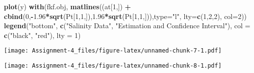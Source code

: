 \documentclass[]{article}
\newenvironment{Shaded}{\begin{snugshade}}{\end{snugshade}}
\newcommand{\DataTypeTok}[1]{\textcolor[rgb]{0.13,0.29,0.53}{#1}}
\newcommand{\DecValTok}[1]{\textcolor[rgb]{0.00,0.00,0.81}{#1}}
\newcommand{\FloatTok}[1]{\textcolor[rgb]{0.00,0.00,0.81}{#1}}
\newcommand{\KeywordTok}[1]{\textcolor[rgb]{0.13,0.29,0.53}{\textbf{#1}}}
\newcommand{\NormalTok}[1]{#1}
\newcommand{\OperatorTok}[1]{\textcolor[rgb]{0.81,0.36,0.00}{\textbf{#1}}}
\newcommand{\StringTok}[1]{\textcolor[rgb]{0.31,0.60,0.02}{#1}}
\begin{document}
\begin{Shaded}
\begin{Highlighting}[]
\KeywordTok{plot}\NormalTok{(y)}
\KeywordTok{with}\NormalTok{(fkf.obj, }\KeywordTok{matlines}\NormalTok{((at[}\DecValTok{1}\NormalTok{,]) }\OperatorTok{+}\StringTok{ }\KeywordTok{cbind}\NormalTok{(}\DecValTok{0}\NormalTok{,}\OperatorTok{-}\FloatTok{1.96}\OperatorTok{*}\KeywordTok{sqrt}\NormalTok{(Pt[}\DecValTok{1}\NormalTok{,}\DecValTok{1}\NormalTok{,]),}\FloatTok{1.96}\OperatorTok{*}\KeywordTok{sqrt}\NormalTok{(Pt[}\DecValTok{1}\NormalTok{,}\DecValTok{1}\NormalTok{,])),}\DataTypeTok{type=}\StringTok{"l"}\NormalTok{, }\DataTypeTok{lty=}\KeywordTok{c}\NormalTok{(}\DecValTok{1}\NormalTok{,}\DecValTok{2}\NormalTok{,}\DecValTok{2}\NormalTok{), }\DataTypeTok{col=}\DecValTok{2}\NormalTok{))}
\KeywordTok{legend}\NormalTok{(}\StringTok{"bottom"}\NormalTok{, }\KeywordTok{c}\NormalTok{(}\StringTok{"Salinity Data"}\NormalTok{, }\StringTok{"Estimation and Confidence Interval"}\NormalTok{),}
       \DataTypeTok{col =} \KeywordTok{c}\NormalTok{(}\StringTok{"black"}\NormalTok{, }\StringTok{"red"}\NormalTok{), }\DataTypeTok{lty =} \DecValTok{1}\NormalTok{)}
\end{Highlighting}
\end{Shaded}

\texttt{[image: Assignment-4\_files/figure-latex/unnamed-chunk-7-1.pdf]}

\begin{Shaded}
\end{Shaded}

\texttt{[image: Assignment-4\_files/figure-latex/unnamed-chunk-8-1.pdf]}

\begin{Shaded}
\end{Shaded}
\end{document}
